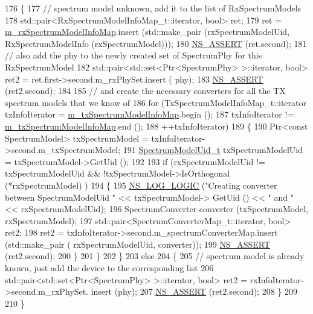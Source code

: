 \begin{DoxyCode}
176     \{
177       \textcolor{comment}{// spectrum model unknown, add it to the list of RxSpectrumModels}
178       std::pair<RxSpectrumModelInfoMap\_t::iterator, bool> ret;
179       ret = \hyperlink{classns3_1_1MultiModelSpectrumChannel_af75faef47b2e879fd82de7364ac2bcd0}{m\_rxSpectrumModelInfoMap}.insert (std::make\_pair (rxSpectrumModelUid, 
      RxSpectrumModelInfo (rxSpectrumModel)));
180       \hyperlink{assert_8h_a6dccdb0de9b252f60088ce281c49d052}{NS\_ASSERT} (ret.second);
181       \textcolor{comment}{// also add the phy to the newly created set of SpectrumPhy for this RxSpectrumModel}
182       std::pair<std::set<Ptr<SpectrumPhy> >::iterator, \textcolor{keywordtype}{bool}> ret2 = ret.first->second.m\_rxPhySet.insert (
      phy);
183       \hyperlink{assert_8h_a6dccdb0de9b252f60088ce281c49d052}{NS\_ASSERT} (ret2.second);
184 
185       \textcolor{comment}{// and create the necessary converters for all the TX spectrum models that we know of}
186       \textcolor{keywordflow}{for} (TxSpectrumModelInfoMap\_t::iterator txInfoIterator = 
      \hyperlink{classns3_1_1MultiModelSpectrumChannel_a401a74579865429a5008431e9000a8be}{m\_txSpectrumModelInfoMap}.begin ();
187            txInfoIterator != \hyperlink{classns3_1_1MultiModelSpectrumChannel_a401a74579865429a5008431e9000a8be}{m\_txSpectrumModelInfoMap}.end ();
188            ++txInfoIterator)
189         \{
190           Ptr<const SpectrumModel> txSpectrumModel = txInfoIterator->second.m\_txSpectrumModel;
191           \hyperlink{namespacens3_a5bf0e89b3407bbb59c90a4d8c4cf0a18}{SpectrumModelUid\_t} txSpectrumModelUid = txSpectrumModel->GetUid ();
192 
193           \textcolor{keywordflow}{if} (rxSpectrumModelUid != txSpectrumModelUid && !txSpectrumModel->IsOrthogonal (*rxSpectrumModel)
      )
194             \{
195               \hyperlink{group__logging_ga88acd260151caf2db9c0fc84997f45ce}{NS\_LOG\_LOGIC} (\textcolor{stringliteral}{"Creating converter between SpectrumModelUid "} << txSpectrumModel->
      GetUid () << \textcolor{stringliteral}{" and "} << rxSpectrumModelUid);
196               SpectrumConverter converter (txSpectrumModel, rxSpectrumModel);
197               std::pair<SpectrumConverterMap\_t::iterator, bool> ret2;
198               ret2 = txInfoIterator->second.m\_spectrumConverterMap.insert (std::make\_pair (
      rxSpectrumModelUid, converter));
199               \hyperlink{assert_8h_a6dccdb0de9b252f60088ce281c49d052}{NS\_ASSERT} (ret2.second);
200             \}
201         \}
202     \}
203   \textcolor{keywordflow}{else}
204     \{
205       \textcolor{comment}{// spectrum model is already known, just add the device to the corresponding list}
206       std::pair<std::set<Ptr<SpectrumPhy> >::iterator, \textcolor{keywordtype}{bool}> ret2 = rxInfoIterator->second.m\_rxPhySet.
      insert (phy);
207       \hyperlink{assert_8h_a6dccdb0de9b252f60088ce281c49d052}{NS\_ASSERT} (ret2.second);
208     \}
209 
210 \}
\end{DoxyCode}


